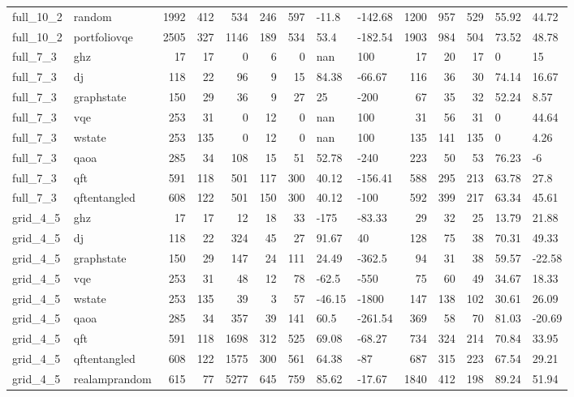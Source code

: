 \begin{longtable}{llrrrrrllrrrll}
full\_10\_2 & random & 1992 & 412 & 534 & 246 & 597 & -11.8 & -142.68 & 1200 & 957 & 529 & 55.92 & 44.72 \\
full\_10\_2 & portfoliovqe & 2505 & 327 & 1146 & 189 & 534 & 53.4 & -182.54 & 1903 & 984 & 504 & 73.52 & 48.78 \\
full\_7\_3 & ghz & 17 & 17 & 0 & 6 & 0 & nan & 100 & 17 & 20 & 17 & 0 & 15 \\
full\_7\_3 & dj & 118 & 22 & 96 & 9 & 15 & 84.38 & -66.67 & 116 & 36 & 30 & 74.14 & 16.67 \\
full\_7\_3 & graphstate & 150 & 29 & 36 & 9 & 27 & 25 & -200 & 67 & 35 & 32 & 52.24 & 8.57 \\
full\_7\_3 & vqe & 253 & 31 & 0 & 12 & 0 & nan & 100 & 31 & 56 & 31 & 0 & 44.64 \\
full\_7\_3 & wstate & 253 & 135 & 0 & 12 & 0 & nan & 100 & 135 & 141 & 135 & 0 & 4.26 \\
full\_7\_3 & qaoa & 285 & 34 & 108 & 15 & 51 & 52.78 & -240 & 223 & 50 & 53 & 76.23 & -6 \\
full\_7\_3 & qft & 591 & 118 & 501 & 117 & 300 & 40.12 & -156.41 & 588 & 295 & 213 & 63.78 & 27.8 \\
full\_7\_3 & qftentangled & 608 & 122 & 501 & 150 & 300 & 40.12 & -100 & 592 & 399 & 217 & 63.34 & 45.61 \\
grid\_4\_5 & ghz & 17 & 17 & 12 & 18 & 33 & -175 & -83.33 & 29 & 32 & 25 & 13.79 & 21.88 \\
grid\_4\_5 & dj & 118 & 22 & 324 & 45 & 27 & 91.67 & 40 & 128 & 75 & 38 & 70.31 & 49.33 \\
grid\_4\_5 & graphstate & 150 & 29 & 147 & 24 & 111 & 24.49 & -362.5 & 94 & 31 & 38 & 59.57 & -22.58 \\
grid\_4\_5 & vqe & 253 & 31 & 48 & 12 & 78 & -62.5 & -550 & 75 & 60 & 49 & 34.67 & 18.33 \\
grid\_4\_5 & wstate & 253 & 135 & 39 & 3 & 57 & -46.15 & -1800 & 147 & 138 & 102 & 30.61 & 26.09 \\
grid\_4\_5 & qaoa & 285 & 34 & 357 & 39 & 141 & 60.5 & -261.54 & 369 & 58 & 70 & 81.03 & -20.69 \\
grid\_4\_5 & qft & 591 & 118 & 1698 & 312 & 525 & 69.08 & -68.27 & 734 & 324 & 214 & 70.84 & 33.95 \\
grid\_4\_5 & qftentangled & 608 & 122 & 1575 & 300 & 561 & 64.38 & -87 & 687 & 315 & 223 & 67.54 & 29.21 \\
grid\_4\_5 & realamprandom & 615 & 77 & 5277 & 645 & 759 & 85.62 & -17.67 & 1840 & 412 & 198 & 89.24 & 51.94 \\

\end{longtable}
